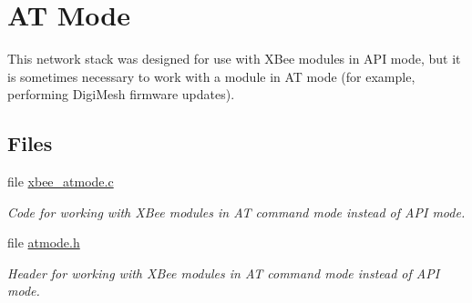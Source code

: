 \hypertarget{group__xbee__atmode}{}\section{AT Mode}
\label{group__xbee__atmode}


This network stack was designed for use with X\+Bee modules in A\+PI mode, but it is sometimes necessary to work with a module in AT mode (for example, performing Digi\+Mesh firmware updates).  


\subsection*{Files}
\begin{DoxyCompactItemize}
\item 
file \hyperlink{xbee__atmode_8c}{xbee\+\_\+atmode.\+c}
\begin{DoxyCompactList}\small\item\em Code for working with X\+Bee modules in AT command mode instead of A\+PI mode. \end{DoxyCompactList}\item 
file \hyperlink{atmode_8h}{atmode.\+h}
\begin{DoxyCompactList}\small\item\em Header for working with X\+Bee modules in AT command mode instead of A\+PI mode. \end{DoxyCompactList}\end{DoxyCompactItemize}
